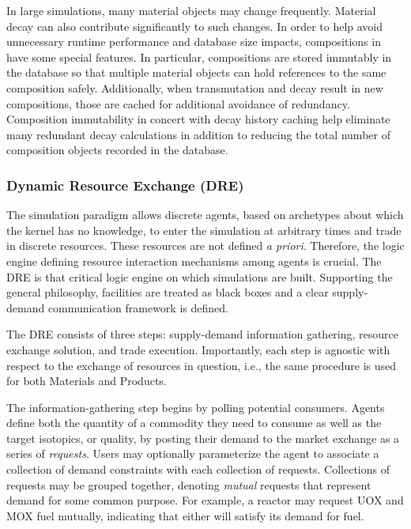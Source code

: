 In large simulations, many material objects may change frequently.  Material
decay can also contribute significantly to such changes.  In order to help
avoid unnecessary runtime performance and database size impacts, compositions
in \Cyclus have some special features.  In particular, compositions are stored
immutably in the database so that multiple material objects can hold references
to the same composition safely.  Additionally, when transmutation and decay
result in new compositions, those are cached for additional avoidance of
redundancy. Composition immutability in concert with decay history caching help
eliminate many redundant decay calculations in addition to reducing the total
number of composition objects recorded in the database.


\subsubsection{Dynamic Resource Exchange (DRE)}

The \Cyclus simulation paradigm allows discrete agents, based on archetypes
about which the kernel has no knowledge, to enter the simulation at arbitrary
times and trade in discrete resources. These resources are not defined \textit{a
  priori}. Therefore, the logic engine defining resource interaction mechanisms
among agents is crucial. The \gls{DRE} is that critical logic engine on which
\Cyclus simulations are built.  Supporting the general \Cyclus philosophy,
facilities are treated as black boxes and a clear supply-demand communication
framework is defined.

The \gls{DRE} consists of three steps: supply-demand information
gathering, resource exchange solution, and trade execution. Importantly, each
step is agnostic with respect to the exchange of resources in question, i.e.,
the same procedure is used for both Materials and Products.

The information-gathering step begins by polling potential consumers. Agents
define both the quantity of a commodity they need to consume as well as the
target isotopics, or quality, by posting their demand to the market exchange as
a series of \textit{requests}. Users may optionally parameterize the agent to
associate a collection of demand constraints with each collection of requests.
Collections of requests may be grouped together, denoting \textit{mutual}
requests that represent demand for
some common purpose. For example, a reactor may request \gls{UOX} and \gls{MOX} fuel
mutually, indicating that either will satisfy its demand for fuel.

